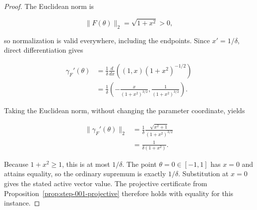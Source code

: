 \begin{proof}
The Euclidean norm is

\begin{equation}
\label{eq:appendix-display-346}
\lVert F(\theta)\rVert_2=\sqrt{1+x^2}>0,
\end{equation}

so normalization is valid everywhere, including the endpoints. Since \(x'=1/\delta\), direct differentiation
gives

\begin{equation}
\label{eq:appendix-display-347}
\begin{aligned}
\gamma_F'(\theta)
&=\frac1\delta\frac{d}{dx}
\left((1,x)(1+x^2)^{-1/2}\right)\\
&=\frac1\delta
\left(
-\frac{x}{(1+x^2)^{3/2}},
\frac{1}{(1+x^2)^{3/2}}
\right).
\end{aligned}
\end{equation}

Taking the Euclidean norm, without changing the parameter coordinate, yields

\begin{equation}
\label{eq:appendix-display-348}
\begin{aligned}
\lVert\gamma_F'(\theta)\rVert_2
&=\frac1\delta
\frac{\sqrt{x^2+1}}{(1+x^2)^{3/2}}\\
&=\frac{1}{\delta(1+x^2)}.
\end{aligned}
\end{equation}

Because \(1+x^2\geq1\), this is at most \(1/\delta\). The point \(\theta=0\in[-1,1]\) has \(x=0\) and
attains equality, so the ordinary supremum is exactly \(1/\delta\). Substitution at \(x=0\) gives the stated
active vector value. The projective certificate from Proposition~\ref{prop:step-001-projective}
therefore holds with equality for this instance. 
\end{proof}

